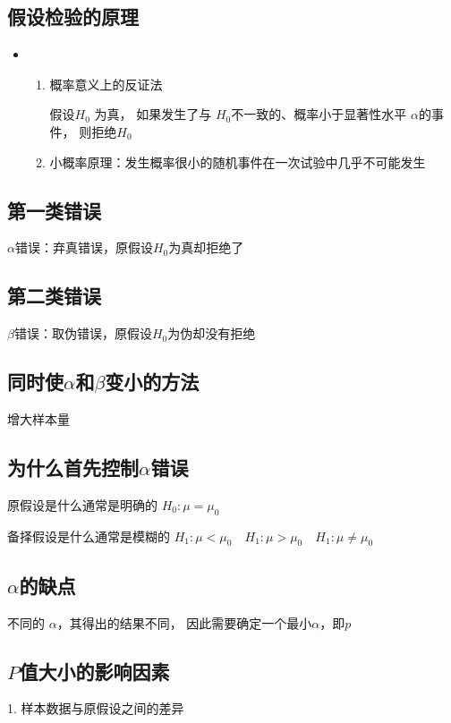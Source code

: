 \documentclass[UTF8,10pt]{book}
\begin{document}
        \subsection{假设检验的原理}	
        {\kaishu
		\begin{itemize}
			\item [] {
				\begin{enumerate}
					\item 概率意义上的反证法 
					
					假设$ H_0 $ 为真，
					如果发生了与 $ H_0 $不一致的、概率小于显著性水平 $ \alpha $的事件，
					则拒绝$ H_0 $ 
					\item 小概率原理：发生概率很小的随机事件在一次试验中几乎不可能发生
				\end{enumerate}
			}
		\end{itemize}
		}
	
        \subsection{第一类错误}
        $ \alpha $错误：弃真错误，原假设$H_0$为真却拒绝了

        \subsection{第二类错误}	
        $ \beta $错误：取伪错误，原假设$H_0$为伪却没有拒绝

        \subsection{同时使$\alpha$和$\beta$变小的方法}	
        增大样本量

        \subsection{为什么首先控制$\alpha$错误}	
        原假设是什么通常是明确的 $H_0: \mu = \mu_0$ 
        
        备择假设是什么通常是模糊的 $H_1: \mu < \mu_0 \quad H_1: \mu > \mu_0 \quad H_1: \mu \neq \mu_0 $

        \subsection{$ \alpha $的缺点}	

        不同的 $\alpha$，其得出的结果不同， 因此需要确定一个最小$\alpha$，即$p$

        \subsection{$P$值大小的影响因素}	
        1. 样本数据与原假设之间的差异 
\end{document}
